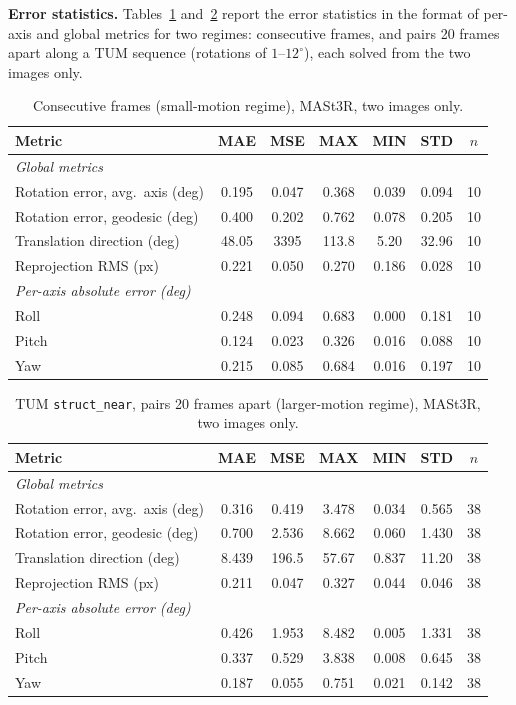 \documentclass[journal]{IEEEtran}
\begin{document}
\textbf{Error statistics.} Tables~\ref{tab:global-small} and~\ref{tab:global-track} report the error statistics in the format of per-axis and global metrics for two regimes: consecutive frames, and pairs 20 frames apart along a TUM sequence (rotations of $1$--$12^\circ$), each solved from the two images only.

\begin{table}[H]
\centering
\caption{Consecutive frames (small-motion regime), MASt3R, two images only.}\label{tab:global-small}
\small\setlength{\tabcolsep}{3pt}
\begin{tabular}{lcccccc}
\toprule
Metric & MAE & MSE & MAX & MIN & STD & $n$\\
\midrule
\multicolumn{7}{l}{\textit{Global metrics}}\\
Rotation error, avg.\ axis (deg) & 0.195 & 0.047 & 0.368 & 0.039 & 0.094 & 10\\
Rotation error, geodesic (deg) & 0.400 & 0.202 & 0.762 & 0.078 & 0.205 & 10\\
Translation direction (deg) & 48.05 & 3395 & 113.8 & 5.20 & 32.96 & 10\\
Reprojection RMS (px) & 0.221 & 0.050 & 0.270 & 0.186 & 0.028 & 10\\
\multicolumn{7}{l}{\textit{Per-axis absolute error (deg)}}\\
Roll & 0.248 & 0.094 & 0.683 & 0.000 & 0.181 & 10\\
Pitch & 0.124 & 0.023 & 0.326 & 0.016 & 0.088 & 10\\
Yaw & 0.215 & 0.085 & 0.684 & 0.016 & 0.197 & 10\\
\bottomrule
\end{tabular}


\end{table}

\begin{table}[H]
\centering
\caption{TUM \texttt{struct\_near}, pairs 20 frames apart (larger-motion regime), MASt3R, two images only.}\label{tab:global-track}
\small\setlength{\tabcolsep}{3pt}
\begin{tabular}{lcccccc}
\toprule
Metric & MAE & MSE & MAX & MIN & STD & $n$\\
\midrule
\multicolumn{7}{l}{\textit{Global metrics}}\\
Rotation error, avg.\ axis (deg) & 0.316 & 0.419 & 3.478 & 0.034 & 0.565 & 38\\
Rotation error, geodesic (deg) & 0.700 & 2.536 & 8.662 & 0.060 & 1.430 & 38\\
Translation direction (deg) & 8.439 & 196.5 & 57.67 & 0.837 & 11.20 & 38\\
Reprojection RMS (px) & 0.211 & 0.047 & 0.327 & 0.044 & 0.046 & 38\\
\multicolumn{7}{l}{\textit{Per-axis absolute error (deg)}}\\
Roll & 0.426 & 1.953 & 8.482 & 0.005 & 1.331 & 38\\
Pitch & 0.337 & 0.529 & 3.838 & 0.008 & 0.645 & 38\\
Yaw & 0.187 & 0.055 & 0.751 & 0.021 & 0.142 & 38\\
\bottomrule
\end{tabular}


\end{table}
\end{document}
